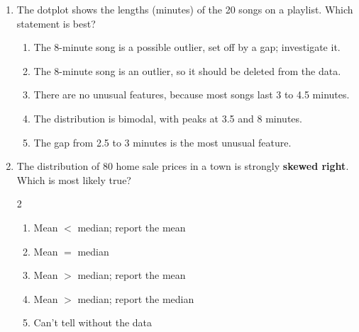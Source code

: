 \documentclass[12pt]{article}
\newenvironment{choices}
  {\begin{enumerate}[label=\textbf{(\Alph*)}, leftmargin=2.2em, itemsep=0pt, topsep=1pt]}
  {\end{enumerate}}
\newcommand{\letterroom}{\rule[-15pt]{0pt}{36pt}}
\begin{document}
\begin{enumerate}[leftmargin=1.9em, itemsep=0.03in]
  \boxguard[11]
  \item \begin{minipage}[t]{0.56\linewidth}\raggedright
        The dotplot shows the lengths (minutes) of the 20 songs on a playlist. Which statement
        is best?
        \end{minipage}\hfill
        \begin{minipage}[t]{0.40\linewidth}
        \centering
        \end{minipage}
        \begin{choices}
          \item The 8-minute song is a possible outlier, set off by a gap; investigate it.
          \item The 8-minute song is an outlier, so it should be deleted from the data.
          \item There are no unusual features, because most songs last 3 to 4.5 minutes.
          \item The distribution is bimodal, with peaks at 3.5 and 8 minutes.
          \item The gap from 2.5 to 3 minutes is the most unusual feature.
                \hfill{}\letterroom
        \end{choices}

  \boxguard[10]
  \item The distribution of 80 home sale prices in a town is strongly \textbf{skewed right}.
        Which is most likely true?\hfill{}\letterroom
        \begin{multicols}{2}
        \begin{choices}
          \item Mean $<$ median; report the mean
          \item Mean $=$ median
          \item Mean $>$ median; report the mean
          \item Mean $>$ median; report the median
          \item Can't tell without the data
        \end{choices}
        \end{multicols}


\end{enumerate}
\end{document}
